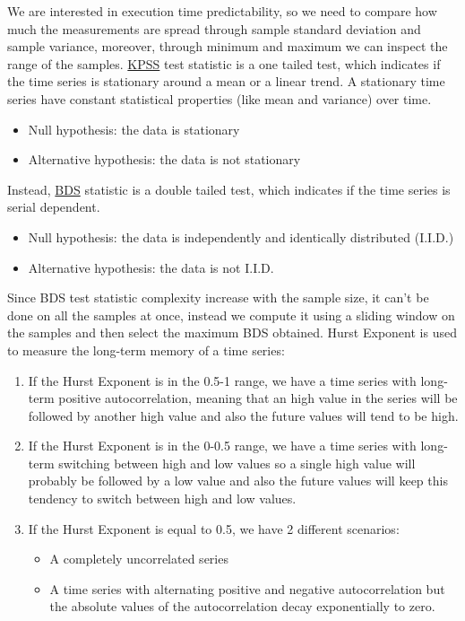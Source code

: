 We are interested in execution time predictability, so we need to compare how much the measurements are spread through sample standard deviation and sample variance, moreover, through minimum and maximum we can inspect the range of the samples.
\href{http://debis.deu.edu.tr/userweb//onder.hanedar/dosyalar/kpss.pdf}{KPSS} test statistic is a one tailed test, which indicates if the time series is stationary around a mean or a linear trend. A stationary time series have constant statistical properties (like mean and variance) over time.
\begin{itemize}
	\item Null hypothesis: the data is stationary
	\item Alternative hypothesis: the data is not stationary
\end{itemize}
Instead, \href{https://www.researchgate.net/publication/46554708_A_Fast_Algorithm_for_the_BDS_Statistic}{BDS} statistic is a double tailed test, which indicates if the time series is serial dependent.
\begin{itemize}
 	\item Null hypothesis: the data is independently and identically distributed (I.I.D.)
 	\item Alternative hypothesis: the data is not I.I.D.
\end{itemize}

Since BDS test statistic complexity increase with the sample size, it can't be done on all the samples at once, instead we compute it using a sliding window on the samples and then select the maximum BDS obtained.\newline
Hurst Exponent is used to measure the long-term memory of a time series:
\begin{enumerate}
	\item If the Hurst Exponent is in the 0.5-1 range, we have a time series with long-term positive autocorrelation, meaning that an high value in the series will be followed by another high value and also the future values will tend to be high.
	\item If the Hurst Exponent is in the 0-0.5 range, we have a time series with long-term switching between high and low values so a single high value will probably be followed by a low value and also the future values will keep this tendency to switch between high and low values.
	\item If the Hurst Exponent is equal to 0.5, we have 2 different scenarios:
	\begin{itemize}
		\item A completely uncorrelated series
		\item A time series with alternating positive and negative autocorrelation but the absolute values of the autocorrelation decay exponentially to zero.
	\end{itemize}
\end{enumerate}

